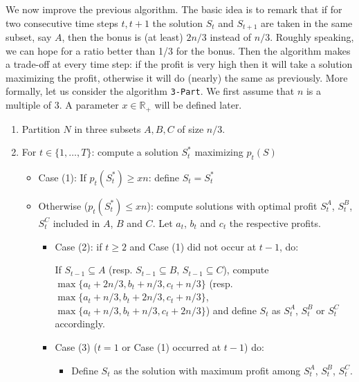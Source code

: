 \documentclass[a4paper]{book}
\newcommand{\finalversion}[1]{#1}
\begin{document}
We now improve the previous algorithm. The basic idea is to remark that if for two consecutive time steps $t,t+1$ the solution $S_t$ and $S_{t+1}$ are taken in the same subset, say $A$, then the bonus is (at least) $2n/3$ instead of $n/3$. Roughly speaking, we can hope for a ratio better than 1/3 for the bonus. Then the algorithm makes a trade-off at every time step: if the profit is very high then it will take a solution maximizing the profit, otherwise it will do (nearly) the same as previously.   
More formally, let us consider the algorithm \texttt{3-Part}. We first assume that $n$ is a multiple of 3. \finalversion{A parameter $x\in\mathbb{R}_+$} will be defined later.

\begin{enumerate}
    \item Partition $N$ in three subsets $A,B,C$ of size $n/3$.
	\item For $t \in \{1, \ldots,T\}$: compute a solution $S^*_t$ maximizing $p_t(S)$
	\begin{itemize}
		\item Case (1): If $p_t(S^*_t) \geq xn$: define $S_t=S^*_t$
		\item Otherwise ($p_t(S^*_t) \leq xn$): compute solutions with optimal profit $S^A_t$, $S^B_t$, $S^C_t$ included in $A$, $B$ and $C$. Let $a_t$, $b_t$ and $c_t$ the respective profits.
		\begin{itemize}
			\item Case (2): if $t\geq 2$ and Case (1) did not occur at $t-1$, do: 
			
			If $S_{t-1}\subseteq A$ (resp. $S_{t-1}\subseteq B$, $S_{t-1}\subseteq C$), compute $\max\{a_t+2n/3, b_t+n/3,c_t+n/3\}$ (resp. $\max\{a_t+n/3, b_t+2n/3,c_t+n/3\}$, $\max\{a_t+n/3, b_t+n/3,c_t+2n/3\}$) and define $S_t$ as $S^A_t$, $S^B_t$ or $S^C_t$ accordingly. 

			\item Case (3) ($t=1$ or Case (1) occurred at $t-1$) do:
			\begin{itemize}
				\item Define $S_t$ as the solution with maximum profit among $S^A_t$, $S^B_t$, $S^C_t$.
			\end{itemize}	
		\end{itemize}
	\end{itemize}
\end{enumerate}
\end{document}
